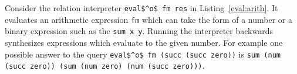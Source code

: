 Consider the relation interpreter \lstinline{eval$^o$ fm res} in Listing~\ref{eval:arith}.
It evaluates an arithmetic expression \lstinline{fm} which can take the form of a number or a binary expression such as the \lstinline{sum x y}.
Running the interpreter backwards synthesizes expressions which evaluate to the given number. For example one possible answer to the query \lstinline{eval$^o$ fm (succ (succ zero))} is \lstinline{sum (num (succ zero)) (sum (num zero) (num (succ zero)))}.



